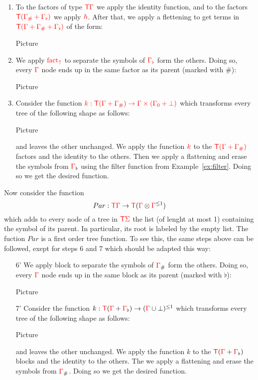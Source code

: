 \begin{example}
\begin{enumerate}
\item To the factors of type ${\color{red}{\mathsf T}} {\color{red}{\Gamma}}$ we apply the identity function, and to the factors ${\color{red}{{\color{red}{\mathsf T}}({\color{red}{\Gamma}}_\#+{\color{red}{\Gamma}}_\flat)}}$ we apply ${\color{red}{h}}$. After that, we apply a flettening to get terms in ${\color{red}{{\color{red}{\mathsf T}}({\color{red}{\Gamma}}+{\color{red}{\Gamma}}_\#+{\color{red}{\Gamma}}_\flat)}}$ of the form:
\begin{center}
Picture
\end{center} 
\item We apply ${\color{red}{\mathrm{fact_{\uparrow}}}}$ to separate the symbols of ${\color{red}{{\color{red}{\Gamma}}_\flat}}$ form the others. Doing so, every ${\color{red}{\Gamma}}$ node ends up in the same factor as its parent (marked with $\#$):
\begin{center}
Picture
\end{center}
\item Consider the function ${\color{red}{k:{\color{red}{\mathsf T}}({\color{red}{\Gamma}}+{\color{red}{\Gamma}}_\#)\to {\color{red}{\Gamma}}\times({\color{red}{\Gamma}}_0+\bot)}}$ which transforms every tree of the following shape as follows:
\begin{center}
Picture
\end{center}
and leaves the other unchanged. We apply the function ${\color{red}{k}}$ to the ${\color{red}{{\color{red}{\mathsf T}}({\color{red}{\Gamma}}+{\color{red}{\Gamma}}_\#)}}$
factors and the identity to the others. Then we apply a flattening and erase the symbols from ${\color{red}{\Gamma}}_\flat$ using the filter function from Example~\ref{ex:filter}. Doing so we get the desired function.
\end{enumerate}
\medskip

Now consider the function $$Par:{\color{red}{\mathsf T}}{\color{red}{\Gamma}}\to {\color{red}{\mathsf T}} ({\color{red}{\Gamma}}\otimes {\color{red}{\Gamma}}^{\leq 1})$$ which adds to every node of a tree in ${\color{red}{\mathsf T}} {\color{red}{\Sigma}}$ the list (of lenght at most 1) containing the symbol of its parent. In particular, its root is labeled by the empty list. 
The fuction $Par$ is a first order tree function. To see this, the same steps above can be followed, exept for steps 6 and 7 which should be adapted this way:
\begin{enumerate}
\item[6'] We apply block to separate the symbols of ${\color{red}{\Gamma}}_\#$ form the others. Doing so, every ${\color{red}{\Gamma}}$ node ends up in the same block as its parent (marked with $\flat$):
\begin{center}
Picture
\end{center}
\item[7'] Consider the function $k:{\color{red}{\mathsf T}}({\color{red}{\Gamma}}+{\color{red}{\Gamma}}_\flat)\to ({\color{red}{\Gamma}}\cup\bot)^{\leq 1}$ which transforms every tree of the following shape as follows:
\begin{center}
Picture
\end{center}
and leaves the other unchanged. We apply the function $k$ to the ${\color{red}{\mathsf T}}({\color{red}{\Gamma}}+{\color{red}{\Gamma}}_\flat)$
blocks and the identity to the others. The we apply a flattening and erase the symbols from ${\color{red}{\Gamma}}_\#$. Doing so we get the desired function.
\end{enumerate} 
\end{example}




